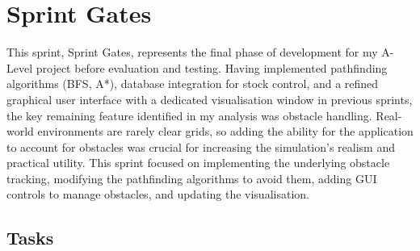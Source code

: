 \newpage


\section{Sprint Gates}

This sprint, Sprint Gates, represents the final phase of development for my A-Level project before evaluation and testing. Having implemented pathfinding algorithms (BFS, A*), database integration for stock control, and a refined graphical user interface with a dedicated visualisation window in previous sprints, the key remaining feature identified in my analysis was obstacle handling. Real-world environments are rarely clear grids, so adding the ability for the application to account for obstacles was crucial for increasing the simulation's realism and practical utility. This sprint focused on implementing the underlying obstacle tracking, modifying the pathfinding algorithms to avoid them, adding GUI controls to manage obstacles, and updating the visualisation.

\subsection{Tasks}

